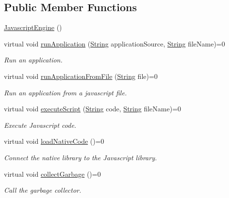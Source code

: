 \subsection*{Public Member Functions}
\begin{DoxyCompactItemize}
\item 
\mbox{\hyperlink{class_rad_j_a_v_1_1_javascript_engine_a148c454c66e90614abbc589e715b3f7c}{Javascript\+Engine}} ()
\item 
virtual void \mbox{\hyperlink{class_rad_j_a_v_1_1_javascript_engine_a11cc903f042db2b770183667ee36c6bf}{run\+Application}} (\mbox{\hyperlink{class_rad_j_a_v_1_1_string}{String}} application\+Source, \mbox{\hyperlink{class_rad_j_a_v_1_1_string}{String}} file\+Name)=0
\begin{DoxyCompactList}\small\item\em Run an application. \end{DoxyCompactList}\item 
virtual void \mbox{\hyperlink{class_rad_j_a_v_1_1_javascript_engine_a0a435f458e118a813c95ccb359d546e9}{run\+Application\+From\+File}} (\mbox{\hyperlink{class_rad_j_a_v_1_1_string}{String}} file)=0
\begin{DoxyCompactList}\small\item\em Run an application from a javascript file. \end{DoxyCompactList}\item 
virtual void \mbox{\hyperlink{class_rad_j_a_v_1_1_javascript_engine_a4cdc81e5c398f7f1a2ce3ff45f135792}{execute\+Script}} (\mbox{\hyperlink{class_rad_j_a_v_1_1_string}{String}} code, \mbox{\hyperlink{class_rad_j_a_v_1_1_string}{String}} file\+Name)=0
\begin{DoxyCompactList}\small\item\em Execute Javascript code. \end{DoxyCompactList}\item 
virtual void \mbox{\hyperlink{class_rad_j_a_v_1_1_javascript_engine_a91b208b07958c50ce906cd9f25eed669}{load\+Native\+Code}} ()=0
\begin{DoxyCompactList}\small\item\em Connect the native library to the Javascript library. \end{DoxyCompactList}\item 
virtual void \mbox{\hyperlink{class_rad_j_a_v_1_1_javascript_engine_a07709e2f1afb9f49444c6605a7a6122f}{collect\+Garbage}} ()=0
\begin{DoxyCompactList}\small\item\em Call the garbage collector. \end{DoxyCompactList}\item 

\end{DoxyCompactItemize}
